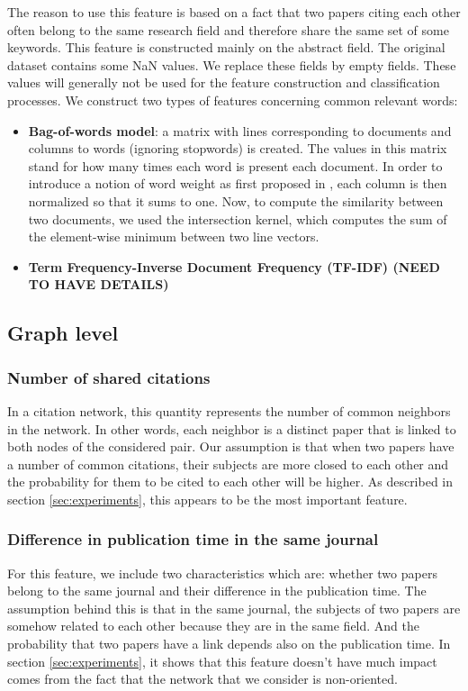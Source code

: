 \documentclass{article}
\begin{document}
The reason to use this feature is based on a fact that two papers citing each other often belong to the same research field and therefore share the same set of some keywords. This feature is constructed mainly on the abstract field. The original dataset contains some NaN values. We replace these fields by empty fields. These values will generally not be used for the feature construction and classification processes. We construct two types of features concerning common relevant words:
\begin{itemize}
\item \textbf{Bag-of-words model}: a matrix with lines corresponding to documents and columns to words (ignoring stopwords) is created. The values in this matrix stand for how many times each word is present each document. In order to introduce a notion of word weight as first proposed in \cite{sparck1972statistical}, each column is then normalized so that it sums to one. Now, to compute the similarity between two documents, we used the intersection kernel, which computes the sum of the element-wise minimum between two line vectors.
\item \textbf{Term Frequency-Inverse Document Frequency (TF-IDF) (NEED TO HAVE DETAILS)}
\end{itemize}
\subsection{Graph level}
\subsubsection{Number of shared citations}

In a citation network, this quantity represents the number of common neighbors in the network. In other words, each neighbor is a distinct paper that is linked to both nodes of the considered pair. Our assumption is that when two papers have a number of common citations, their subjects are more closed to each other and the probability for them to be cited to each other will be higher. As described in section \ref{sec:experiments}, this appears to be the most important feature.

\subsubsection{Difference in publication time in the same journal}

For this feature, we include two characteristics which are: whether two papers belong to the same journal and their difference in the publication time. The assumption behind this is that in the same journal, the subjects of two papers are somehow related to each other because they are in the same field. And the probability that two papers have a link depends also on the publication time. In section \ref{sec:experiments}, it shows that this feature doesn't have much impact comes from the fact that the network that we consider is non-oriented.
\end{document}
